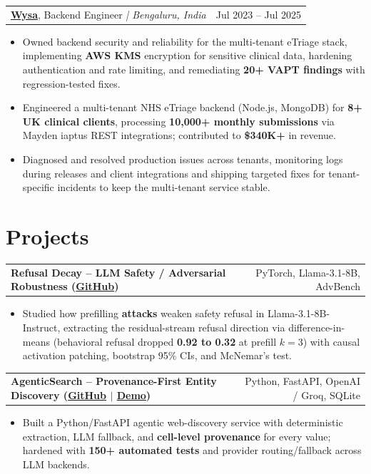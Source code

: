 \documentclass[letterpaper,11pt]{article}
\makeatletter
\newcommand{\expItem}[4]{%
  \vspace{2pt}
  \begin{tabular*}{\textwidth}{@{}l@{\extracolsep{\fill}}r@{}}
    \textbf{#1}, #2 \textit{| #3} & #4 \\
  \end{tabular*}\par\vspace{-3pt}
}
\newcommand{\projItem}[2]{%
  \vspace{2pt}
  \begin{tabular*}{\textwidth}{@{}l@{\extracolsep{\fill}}r@{}}
    \textbf{#1} & #2 \\
  \end{tabular*}\par\vspace{-3pt}
}
\makeatother
\begin{document}
\expItem{\href{https://www.wysa.io}{Wysa}}{Backend Engineer}{Bengaluru, India}{Jul 2023 -- Jul 2025}
\begin{itemize}
  \item Owned backend security and reliability for the multi-tenant eTriage stack, implementing \textbf{AWS KMS} encryption for sensitive clinical data, hardening authentication and rate limiting, and remediating \textbf{20+ VAPT findings} with regression-tested fixes.
  \item Engineered a multi-tenant NHS eTriage backend (Node.js, MongoDB) for \textbf{8+ UK clinical clients}, processing \textbf{10{,}000+ monthly submissions} via Mayden iaptus REST integrations; contributed to \textbf{\$340K+} in revenue.
  \item Diagnosed and resolved production issues across tenants, monitoring logs during releases and client integrations and shipping targeted fixes for tenant-specific incidents to keep the multi-tenant service stable.
\end{itemize}

\section{Projects}

\projItem{Refusal Decay -- LLM Safety / Adversarial Robustness {\normalfont\small(\href{https://github.com/Deva-1903/refusal-decay}{GitHub})}}{PyTorch, Llama-3.1-8B, AdvBench}
\begin{itemize}
  \item Studied how prefilling \textbf{attacks} weaken safety refusal in Llama-3.1-8B-Instruct, extracting the residual-stream refusal direction via difference-in-means (behavioral refusal dropped \textbf{0.92 to 0.32} at prefill $k{=}3$) with causal activation patching, bootstrap 95\% CIs, and McNemar's test.
\end{itemize}

\projItem{AgenticSearch -- Provenance-First Entity Discovery {\normalfont\small(\href{https://github.com/Deva-1903/ciir_agentic_search}{GitHub} $\vert$ \href{https://agentic-search-negglszkwa-uc.a.run.app}{Demo})}}{Python, FastAPI, OpenAI / Groq, SQLite}
\begin{itemize}
  \item Built a Python/FastAPI agentic web-discovery service with deterministic extraction, LLM fallback, and \textbf{cell-level provenance} for every value; hardened with \textbf{150+ automated tests} and provider routing/fallback across LLM backends.
\end{itemize}
\end{document}
